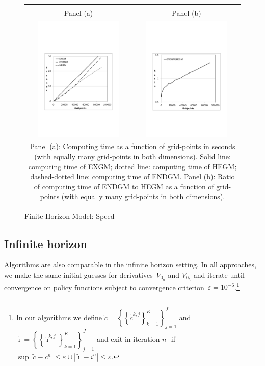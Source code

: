 \documentclass[a4paper,12pt]{article}%
\begin{document}
\begin{figure}[htb] \centering
\caption{Finite Horizon Model: Speed}
\begin{tabular}
[c]{cc}
& \\
Panel (a) & Panel (b)\\
{\includegraphics[height=6.0cm, width=6.0cm]{Abbildungen/Seconds_Finite.pdf}} & {\includegraphics[height=6.0cm, width=6.0cm]{Abbildungen/Ratio_Finite.pdf}} \\
\multicolumn{2}{p{15cm}}{{\footnotesize Panel (a): Computing time as a function of grid-points in seconds (with equally many grid-points in both dimensions). Solid line: computing time of EXGM; dotted line: computing time of HEGM; dashed-dotted line: computing time of ENDGM. Panel (b): Ratio of computing time of ENDGM to HEGM as a function of grid-points (with equally many grid-points in both dimensions).}}
\end{tabular}
\label{graph_finte}
\end{figure}

\subsection{Infinite horizon}

Algorithms are also comparable in the infinite horizon setting. In all approaches, we make the same initial guesses for derivatives~$V_{0_{a}}$ and $V_{0_{h}}$ and iterate until convergence on policy functions subject to convergence criterion~$\varepsilon=10^{-6}$.\footnote{In our algorithms we define $\tilde{c}=\left\{  \left\{ \tilde{c}^{k,j}\right\}  _{k=1}^{K}\right\}  _{j=1}^{J}$ and $\tilde{\imath}=\left\{  \left\{  \tilde{\imath}^{k,j}\right\}  _{k=1}^{K}\right\}  _{j=1}^{J}$ and exit in iteration $n\,$\ if $\sup|\tilde{c}-c^{n}|\leq\varepsilon\cup|\tilde{\imath}-i^{n}|\leq\varepsilon.$}
\end{document}
